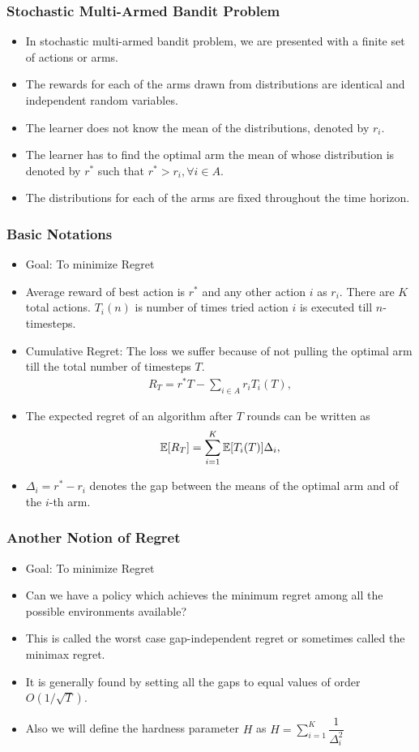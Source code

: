 \begin{frame}
\frametitle{Stochastic Multi-Armed Bandit Problem}
\begin{itemize}
\item<1-> In stochastic multi-armed bandit problem, we are presented with a finite set of actions or arms. 
\item<2-> The rewards for each of the arms drawn from distributions are identical and independent random variables. 
\item<3-> The learner does not know the mean of the distributions, denoted by $r_{i}$. 
\item<4-> The learner has to find the optimal arm the mean of whose distribution is denoted by $r^{*}$ such that $r^{*}> r_{i}, \forall i\in A$.
\item<5-> The distributions for each of the arms are fixed throughout the time horizon. 
\end{itemize}
\end{frame}

\begin{frame}
\frametitle{Basic Notations}
\begin{itemize}
\item<1-> Goal: To minimize Regret
\item<2-> Average reward of best action is $r^{*}$ and any other action $i$ as $r_{i}$. There are $K$ total actions. $T_{i}(n)$ is number of times tried action $i$ is executed till $n$-timesteps.
\item<3-> Cumulative Regret: The loss we suffer because of not pulling the optimal arm till the total number of timesteps  $T$. 
\begin{align*}
R_{T}=r^{*}T - \sum_{i\in A} r_{i}T_{i}(T),
\end{align*}
\item<4-> The expected regret of an algorithm after $T$ rounds can be written as
\begin{align*}
\mathbb{E}[R_{T}]= \sum_{i=1}^K \mathbb{E}[T_{i}(T)] \Delta_i,
\end{align*}
\item<4-> $\Delta_{i}=r^{*}-r_{i}$ denotes the gap between the means of the optimal arm and of the $i$-th arm. 
\end{itemize}
\end{frame}

\begin{frame}
\frametitle{Another Notion of Regret}
\begin{itemize}
\item<1-> Goal: To minimize Regret
\item<2-> Can we have a policy which achieves the minimum regret among all the possible environments available?
\item<3-> This is called the worst case gap-independent regret or sometimes called the minimax regret.
\item<4-> It is generally found by setting all the gaps to equal values of order $O\left( 1/\sqrt{T} \right)$.
\item<5-> Also we will define the hardness parameter $H$ as $H=\sum_{i=1}^{K}\dfrac{1}{\Delta_{i}^2}$
\end{itemize}
\end{frame}